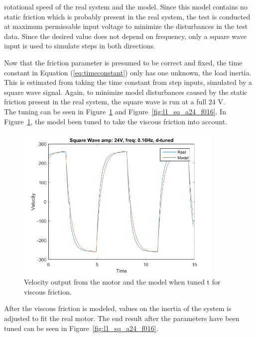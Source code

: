 \documentclass[12pt,a4paper]{article}
\begin{document}
rotational speed of the real system and the model. Since this model contains no
static friction which is probably present in the real system, the test is
conducted at maximum permissable input voltage to minimize the disturbances in
the test data. Since the desired value does not depend on frequency, only a
square wave input is used to simulate steps in both directions. \par
Now that the friction parameter is presumed to be correct and fixed, the time
constant in Equation (\ref{eq:timeconstant}) only has one unknown, the load
inertia. This is estimated from taking the time constant from step inputs,
simulated by a square wave signal. Again, to minimize model disturbances caused
by the static friction present in the real system, the square wave is run at a
full 24 V.\\
The tuning can be seen in Figure~\ref{fig:l1_sq_a24_f016_dtuned} and
Figure~\ref{fig:l1_sq_a24_f016}. In
Figure~\ref{fig:l1_sq_a24_f016_dtuned}, the model been tuned to take the
viscous friction into account.
\begin{figure}[H]
    \centering
    \includegraphics[width=100mm]{l1_sq_a24_f016_dtuned.png}
    \caption{Velocity output from the motor and the model when tuned
t    for viscous friction.}
    \label{fig:l1_sq_a24_f016_dtuned}
\end{figure}
After the viscous friction is modeled, values on the inertia of the
system is adjusted to fit the real motor. The end result after the
parameters have been tuned can be seen in
Figure~\ref{fig:l1_sq_a24_f016}.
\end{document}
